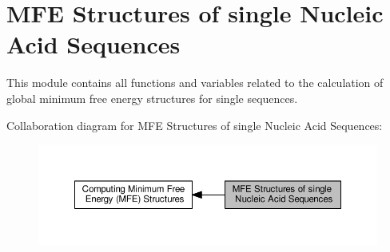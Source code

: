 \hypertarget{group__mfe__fold__single}{}\section{M\+F\+E Structures of single Nucleic Acid Sequences}
\label{group__mfe__fold__single}


This module contains all functions and variables related to the calculation of global minimum free energy structures for single sequences.  


Collaboration diagram for M\+F\+E Structures of single Nucleic Acid Sequences\+:
\nopagebreak
\begin{figure}[H]
\begin{center}
\leavevmode
\includegraphics[width=350pt]{group__mfe__fold__single}
\end{center}
\end{figure}
